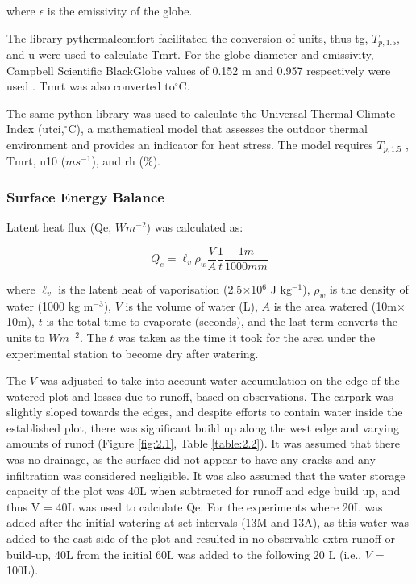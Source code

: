 \documentclass[final,3p,times,authoryear]{elsarticle}
\begin{document}
where $\epsilon$ is the emissivity of the globe.

The library pythermalcomfort facilitated the conversion of units, thus \gls{tg}, $T_{p,1.5}$, and \gls{u} were used to calculate \gls{Tmrt}. For the globe diameter and emissivity, Campbell Scientific BlackGlobe values of 0.152 m and 0.957 respectively were used \citep{CampbellScientific2022}. \gls{Tmrt} was also converted to$^{\circ}$C.

The same python library was used to calculate the Universal Thermal Climate Index (\gls{utci},$^{\circ}$C), a mathematical model that assesses the outdoor thermal environment and provides an indicator for heat stress. The model requires $T_{p,1.5}$ , \gls{Tmrt}, \gls{u10} ($ms^{-1}$), and \gls{rh} (\%).



\subsubsection{Surface Energy Balance}\label{sec:appendix7.4.5}

Latent heat flux (\gls{Qe}, $Wm^{-2}$) was calculated as:

\begin{equation}
Q_{e} = \ell _{v} \rho_{w} \frac{V}{A} \frac{1}{t} \frac{1m}{1000mm}
\label{eq:7.11}
\end{equation}

where $\ell _{v}$ is the latent heat of vaporisation (2.5$\times$10$^{6}$ J kg$^{-1}$), $\rho_{w}$ is the density of water (1000 kg m$^{-3}$), $V$ is the volume of water (L), $A$ is the area watered (10m$\times$10m), $t$ is the total time to evaporate (seconds), and the last term converts the units to $Wm^{-2}$. The $t$ was taken as the time it took for the area under the experimental station to become dry after watering.

The $V$ was adjusted to take into account water accumulation on the edge of the watered plot and losses due to runoff, based on observations. The carpark was slightly sloped towards the edges, and despite efforts to contain water inside the established plot, there was significant build up along the west edge and varying amounts of runoff (Figure \ref{fig:2.1}, Table \ref{table:2.2}). It was assumed that there was no drainage, as the surface did not appear to have any cracks and any infiltration was considered negligible. It was also assumed that the water storage capacity of the plot was 40L when subtracted for runoff and edge build up, and thus V = 40L was used to calculate \gls{Qe}. For the experiments where 20L was added after the initial watering at set intervals (13M and 13A), as this water was added to the east side of the plot and resulted in no observable extra runoff or build-up, 40L from the initial 60L was added to the following 20 L (i.e., $V$ = 100L).
\end{document}
